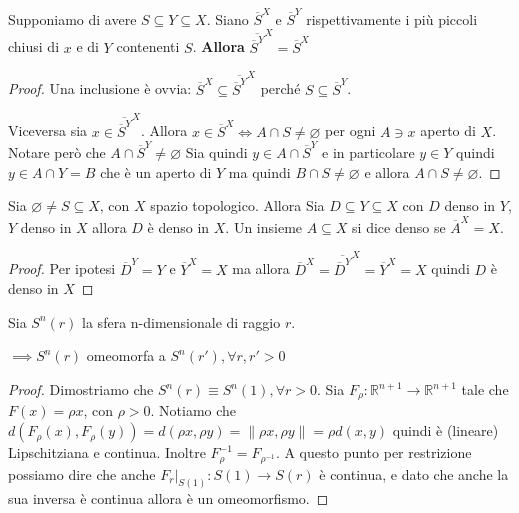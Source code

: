 \begin{proposition}
    Supponiamo di avere \(S \subseteq Y \subseteq X  \). Siano
    \(\overline{S}^{X}\) e \(\overline{S}^{Y}\) rispettivamente i più piccoli
    chiusi di \(x\) e di \(Y\) contenenti \(S\).
    \textbf{Allora} \(\overline{\overline{S}^{Y}}^{X} = \overline{S}^{X}\) 
\end{proposition}
\begin{proof}
    Una inclusione è ovvia: \(\overline{S}^{X} \subseteq
    \overline{\overline{S}^{Y}}^{X} \) perché \(S \subseteq \overline{S}^{Y} \).

    Viceversa sia \(x \in \overline{\overline{S}^{Y}}^{X}\). Allora \(x \in
    \overline{S}^{X} \iff A \cap S \neq \varnothing\) per ogni \(A \ni x\) aperto di
    \(X\). Notare però che \(A \cap \overline{S}^{Y} \neq \varnothing\) Sia
    quindi \(y \in  A \cap  \overline{S}^{Y}\) e in particolare \(y \in Y\)
    quindi \(y \in A \cap Y = B\) che è un aperto di \(Y\) ma quindi \(B \cap  S
    \neq \varnothing\) e allora \(A \cap S \neq \varnothing\).
\end{proof}

\begin{proposition}
    Sia \(\varnothing \neq S \subseteq X \), con \(X\) spazio topologico. Allora
    Sia \(D \subseteq Y \subseteq X  \) con \(D\) denso in \(Y\), \(Y\) denso in
    \(X\) allora \(D\) è denso in \(X\). Un insieme \(A \subseteq X \) si dice
    denso se \(\overline{A}^{X} = X\).
\end{proposition}
\begin{proof}
    Per ipotesi \(\overline{D}^{Y} = Y\) e \(\overline{Y}^{X} = X\) ma allora
    \(\overline{D}^{X} = \overline{\overline{D}^{Y}}^{X} = \overline{Y}^{X} =
    X\) quindi \(D\) è denso in \(X\) 
\end{proof}


\begin{example}
    Sia \(S^{n}(r)\) la sfera n-dimensionale di raggio \(r\).

    \(\implies  S^{n}(r)\) omeomorfa a \(S^{n}(r'), \forall r, r' > 0\) 
\end{example}
\begin{proof}
    Dimostriamo che \(S^{n}(r) \equiv S^{n}(1), \forall r > 0\). Sia \(F_\rho :
    \mathbb{R}^{n+1} \to  \mathbb{R}^{n+1}\) tale che \(F(x) = \rho x\), con
    \(\rho > 0\). Notiamo che \(d(F_\rho (x), F_\rho(y)) = d(\rho x, \rho y) =
    \| \rho x, \rho y\| = \rho d(x, y)\) quindi è (lineare) Lipschitziana e continua.
    Inoltre \(F_\rho ^{-1} = F_{\rho ^{-1}}\). A questo punto per restrizione
    possiamo dire che anche \(F_r|_{S(1)} : S(1) \to S(r)\) è continua, e dato
    che anche la sua inversa è continua allora è un omeomorfismo.
\end{proof}

